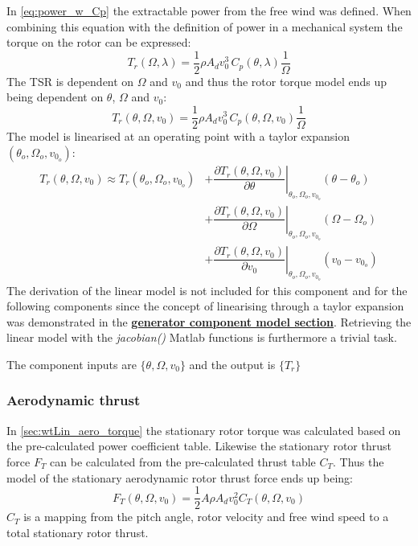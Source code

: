 In \cref{eq:power_w_Cp} the extractable power from the free wind was defined. When combining this equation with the definition of power in a mechanical system the torque on the rotor can be expressed:
\begin{equation}\label{eq:wtLin_Mrot_lambda}
	T_r(\Omega, \lambda) = \dfrac{1}{2} \rho A_d v_0^3 \, C_p(\theta, \lambda) \dfrac{1}{\Omega}
\end{equation}
The TSR is dependent on $ \Omega $ and $ v_0 $ and thus the rotor torque model ends up being dependent on $ \theta $, $ \Omega $ and $ v_0 $:
\begin{equation}\label{eq:wtLin_Mrot_wind}
	T_r(\theta, \Omega, v_0) = \dfrac{1}{2} \rho A_d v_0^3 \, C_p(\theta, \Omega, v_0) \dfrac{1}{\Omega}
\end{equation}
The model is linearised at an operating point with a taylor expansion $ (\theta_o, \Omega_o, v_{0_o}) $:
\begin{align}
	T_r(\theta, \Omega, v_0) \approx T_r(\theta_o, \Omega_o, v_{0_o}) 
	& + \left. \dfrac{\partial T_r(\theta, \Omega, v_0)}{\partial \theta} \right |_{\theta_o, \Omega_o, v_{0_o}} ( \theta-\theta_o) \\
	& + \left. \dfrac{\partial T_r(\theta, \Omega, v_0)}{\partial \Omega} \right |_{\theta_o, \Omega_o, v_{0_o}} ( \Omega-\Omega_o) \\
	& + \left. \dfrac{\partial T_r(\theta, \Omega, v_0)}{\partial v_0} \right |_{\theta_o, \Omega_o, v_{0_o}} ( v_0 - v_{0_o})
\end{align}
The derivation of the linear model is not included for this component and for the following components since the concept of linearising through a taylor expansion was demonstrated in the \hyperref[sec:wtlin_generator]{\textbf{generator component model section}}. Retrieving the linear model with the \textit{jacobian()} Matlab functions is furthermore a trivial task.

The component inputs are $ \{\theta, \Omega, v_0\} $ and the output is $ \{T_r\} $

\subsubsection{Aerodynamic thrust} \label{sec:wtLin_aero_thrust}
In \cref{sec:wtLin_aero_torque} the stationary rotor torque was calculated based on the pre-calculated power coefficient table. Likewise the stationary rotor thrust force $ F_T $ can be calculated from the pre-calculated thrust table $ C_T $. Thus the model of the stationary aerodynamic rotor thrust force ends up being:
\begin{equation} \label{eq:wtLin_aero_thrust}
	F_T(\theta, \Omega, v_0) = \dfrac{1}{2} A \rho A_d v_0^2 C_T(\theta, \Omega, v_0)
\end{equation}
$ C_T $ is a mapping from the pitch angle, rotor velocity and free wind speed to a total stationary rotor thrust.

